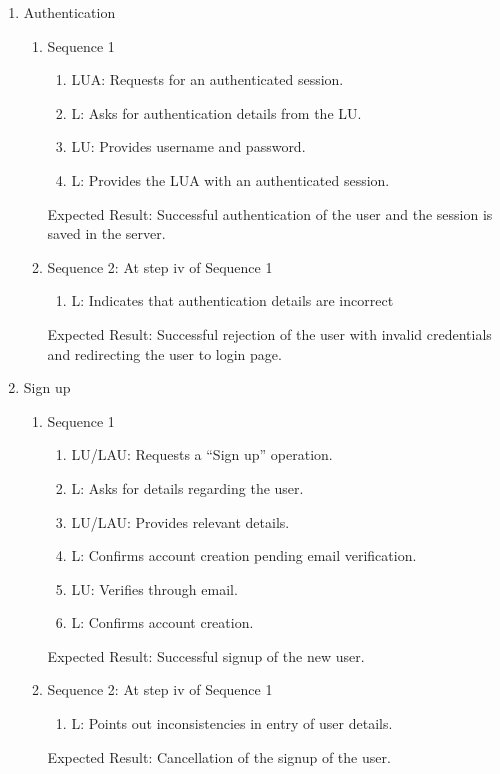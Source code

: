 \documentclass[11pt]{report} %
\begin{document}
\begin{enumerate}
\item
	Authentication
		\begin{enumerate}
			\item
				Sequence 1
					\begin{enumerate}
						\item
							LUA: Requests for an authenticated session.
						\item
							L: Asks for authentication details from the LU.
						\item
							LU: Provides username and password.
						\item
							L: Provides the LUA with an authenticated session.
					\end{enumerate}
				Expected Result: Successful authentication of the user and the session is saved in the server.					
			\item
				Sequence 2: At step iv of Sequence 1
					\begin{enumerate}
						\item
							L: Indicates that authentication details are incorrect					
					\end{enumerate}
				Expected Result: Successful rejection of the user with invalid credentials and redirecting the user to login page.					
		\end{enumerate}

\item
	Sign up
		\begin{enumerate}
			\item
				Sequence 1
					\begin{enumerate}
						\item
							LU/LAU: Requests a “Sign up” operation.
						\item
							L: Asks for details regarding the user.
						\item
							LU/LAU: Provides relevant details.
						\item
							L: Confirms account creation pending email verification.
						\item
							LU: Verifies through email.
						\item
							L: Confirms account creation.

					\end{enumerate}
				Expected Result: Successful signup of the new user.					
			\item
				Sequence 2: At step iv of Sequence 1
					\begin{enumerate}
						\item
							L: Points out inconsistencies in entry of user details.		
					\end{enumerate}
				Expected Result: Cancellation of the signup of the user.					
		\end{enumerate}


\end{enumerate}
\end{document}
